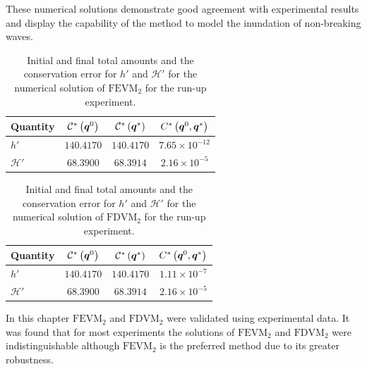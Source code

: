 These numerical solutions demonstrate good agreement with experimental results and display the capability of the method to model the inundation of non-breaking waves.

\begin{table}
	\centering
	\begin{tabular}{l  c  c c}
		Quantity& $\mathcal{C}^*\left(\boldsymbol{q}^0\right)$ & $\mathcal{C}^*\left(\boldsymbol{q}^*\right)$ & ${C}^*\left(\boldsymbol{q}^0,\boldsymbol{q}^*\right)$  \B\\
		\hline 
		$h'$ & $140.4170$ & $140.4170$ & $7.65\times 10^{-12}$ \T \\
		$\mathcal{H}'$ & $68.3900$ & $68.3914$ & $2.16 \times 10^{-5}$ \B\\
		\hline
	\end{tabular}
	\caption{Initial and final total amounts and the conservation error for $h'$ and $\mathcal{H}'$ for the numerical solution of $\text{FEVM}_2$ for the run-up experiment.}
	\label{tab:ConservationSynFEVM}
\end{table}
\begin{table}
	\centering
	\begin{tabular}{l  c  c c}
		Quantity& $\mathcal{C}^*\left(\boldsymbol{q}^0\right)$ & $\mathcal{C}^*\left(\boldsymbol{q}^*\right)$ & ${C}^*\left(\boldsymbol{q}^0,\boldsymbol{q}^*\right)$ \B \\
		\hline
		$h'$ & $140.4170$ & $140.4170$ & $1.11\times 10^{-7}$ \T\\
		$\mathcal{H}'$ & $68.3900$ & $68.3914$ & $2.16 \times 10^{-5}$ \B \\
		\hline
	\end{tabular}
	\caption{Initial and final total amounts and the conservation error for $h'$ and $\mathcal{H}'$ for the numerical solution of $\text{FDVM}_2$ for the run-up experiment.}
	\label{tab:ConservationSynFDVM}
\end{table}

\medskip
In this chapter $\text{FEVM}_2$ and $\text{FDVM}_2$ were validated using experimental data. It was found that for most experiments the solutions of $\text{FEVM}_2$ and $\text{FDVM}_2$ were indistinguishable although $\text{FEVM}_2$ is the preferred method due to its greater robustness. 

